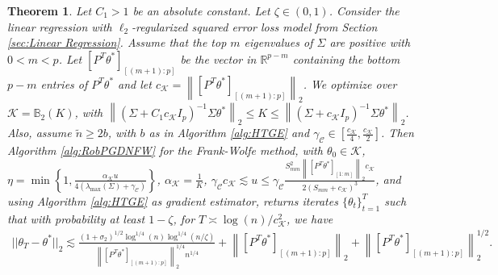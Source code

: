 \documentclass{article}
\newtheorem{theorem}{Theorem}
\begin{document}
\begin{theorem}
\label{theorem:ACCFW_lambda=0}
Let $C_1 > 1$ be an absolute constant. Let $\zeta \in (0, 1)$. Consider the linear regression with $\ell_2$-regularized squared error loss model from Section \ref{sec:Linear Regression}. Assume that the top $m$ eigenvalues of $\Sigma$ are positive with $0 < m < p$. Let $[P^T\theta^*]_{[(m + 1):p]}$ be the vector in $\mathbb{R}^{p - m}$ containing the bottom $p - m$ entries of $P^T\theta^*$ and let $c_{\mathcal{K}} = \left\|[P^T\theta^*]_{[(m + 1):p]}\right\|_2$. We optimize over $\mathcal{K} = \mathbb{B}_2\left(K\right)$, with $\left\|\left(\Sigma + C_1c_{\mathcal{K}}I_p\right)^{-1}\Sigma\theta^*\right\|_2 \leq K \leq \left\|\left(\Sigma + c_{\mathcal{K}}I_p\right)^{-1}\Sigma\theta^*\right\|_2$. Also, assume $\widetilde{n} \geq 2b$, with $b$ as in Algorithm \ref{alg:HTGE} and $\gamma_{\mathcal{C}} \in\left[\frac{c_{\mathcal{K}}}{4}, \frac{c_{\mathcal{K}}}{2}\right]$. Then Algorithm \ref{alg:RobPGDNFW} for the Frank-Wolfe method, with $\theta_0 \in \mathcal{K}$, $\eta = \min\left\{1, \frac{\alpha_{\mathcal{K}} u}{4(\lambda_{\max}(\Sigma) + \gamma_{\mathcal{C}})}\right\}$, $\alpha_{\mathcal{K}} = \frac{1}{K}$, $\gamma_{\mathcal{C}}c_{\mathcal{K}} \lesssim u \leq \gamma_{\mathcal{C}}\frac{S_{mm}^2\left\|[P^T\theta^*]_{[1:m]}\right\|_2c_{\mathcal{K}}}{2(S_{mm} + c_{\mathcal{K}})^3}$, and using Algorithm \ref{alg:HTGE} as gradient estimator, returns iterates $\{\theta_t\}_{t = 1}^T$ such that with probability at least $1 - \zeta$, for $T \asymp \log(n)/c_{\mathcal{K}}^2$,
we have
\begin{align*}
||\theta_T - \theta^*||_2 \lesssim \frac{(1 + \sigma_2)^{1/2}\log^{1/4}(n)\log^{1/4}\left(n/\zeta\right)}{\left\|[P^T\theta^*]_{[(m+1):p]}\right\|_2^{1/4}n^{1/4}} + \left\|[P^T\theta^*]_{[(m+1):p]}\right\|_2 + \left\|[P^T\theta^*]_{[(m+1):p]}\right\|_2^{1/2}.
\end{align*}
\end{theorem}
\end{document}
